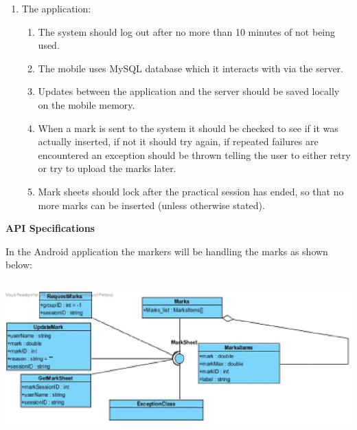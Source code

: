 \documentclass{article}
\begin{document}
\noindent 

\noindent 

\noindent 

\noindent 

\noindent 

\noindent 

\noindent 

\noindent 

\noindent 

\begin{enumerate}
\item  The application:

\begin{enumerate}
\item  The system should log out after no more than 10 minutes of not being used.

\item  The mobile uses MySQL database which it interacts with via the server.

\item  Updates between the application and the server should be saved locally on the mobile memory.

\item  When a mark is sent to the system it should be checked to see if it was actually inserted, if not it should try again, if repeated failures are encountered an exception should be thrown telling the user to either retry or try to upload the marks later.

\item  Mark sheets should lock after the practical session has ended, so that no more marks can be inserted (unless otherwise stated). 
\end{enumerate}
\end{enumerate}



\noindent \textbf{API Specifications}



\noindent In the Android application the markers will be handling the marks as shown below:

\noindent 

\textbf{\includegraphics*[width=6.06in, height=2.32in, keepaspectratio=false]{image17}}
\end{document}
